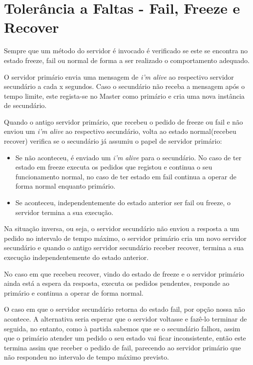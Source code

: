 \section{Tolerância a Faltas - Fail, Freeze e Recover}

Sempre que um método do servidor é invocado é verificado se este se encontra no estado freeze, fail ou normal de forma a ser realizado o comportamento adequado.

O servidor primário envia uma mensagem de \textit{i’m alive} ao respectivo servidor secundário a cada x segundos. Caso o secundário não receba a mensagem após o tempo limite, este regista-se no Master como primário e cria uma nova instância de secundário.

Quando o antigo servidor primário, que recebeu o pedido de freeze ou fail e não enviou um \textit{i’m alive} ao respectivo secundário, volta ao estado normal(recebeu recover) verifica se o secundário já assumiu o papel de servidor primário:
\begin{itemize}
\item Se não aconteceu, é enviado um \textit{i’m alive} para o secundário. No caso de ter estado em freeze executa os pedidos que registou e continua o seu funcionamento normal, no caso de ter estado em fail continua a operar de forma normal enquanto primário.
\item Se aconteceu, independentemente do estado anterior ser fail ou freeze, o servidor termina a sua execução.
\end{itemize}
Na situação inversa, ou seja, o servidor secundário não enviou a resposta a um pedido no intervalo de tempo máximo, o servidor primário cria um novo servidor secundário e quando o antigo servidor secundário receber recover, termina a sua execução independentemente do estado anterior. 

No caso em que recebeu recover, vindo do estado de freeze e o servidor primário ainda está a espera da resposta, executa os pedidos pendentes, responde ao primário e continua a operar de forma normal. 

O caso em que o servidor secundário retorna do estado fail, por opção nossa não acontece. A alternativa seria esperar que o servidor voltasse e fazê-lo terminar de seguida, no entanto, como à partida sabemos que se o secundário falhou, assim que o primário atender um pedido o seu estado vai ficar inconsistente, então este termina assim que receber o pedido de fail, parecendo ao servidor primário que não respondeu no intervalo de tempo máximo previsto.
